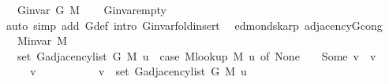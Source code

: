 \begin{isabellebody}
\ \ \ {\isachardoublequoteopen}G{\isachardot}{\kern0pt}invar\ {\isacharparenleft}{\kern0pt}G{}{\isacharunderscore}{\kern0pt}{}\ M{\isacharparenright}{\kern0pt}{\isachardoublequoteclose}%
\endisataginvisible
{\isafoldinvisible}%
%
\isadeliminvisible
\isanewline
%
\endisadeliminvisible
%
\isadelimproof
\ \ %
\endisadelimproof
%
\isatagproof
{}\isamarkupfalse%
\ G{\isachardot}{\kern0pt}invar{\isacharunderscore}{\kern0pt}empty\isanewline
\ \ \isamarkupfalse%
\ {\isacharparenleft}{\kern0pt}auto\ simp\ add{\isacharcolon}{\kern0pt}\ G{}{\isacharunderscore}{\kern0pt}{}{\isacharunderscore}{\kern0pt}def\ intro{\isacharcolon}{\kern0pt}\ G{\isachardot}{\kern0pt}invar{\isacharunderscore}{\kern0pt}fold{\isacharunderscore}{\kern0pt}insert{\isacharparenright}{\kern0pt}%
\endisatagproof
{\isafoldproof}%
%
\isadelimproof
\isanewline
%
\endisadelimproof
%
\isadeliminvisible
\isanewline
%
\endisadeliminvisible
%
\isataginvisible
{}\isamarkupfalse%
\ {\isacharparenleft}{\kern0pt}\ edmonds{\isacharunderscore}{\kern0pt}karp{\isacharparenright}{\kern0pt}\ adjacency{\isacharunderscore}{\kern0pt}G{}{\isacharunderscore}{\kern0pt}{}{\isacharunderscore}{\kern0pt}cong{\isacharcolon}{\kern0pt}\isanewline
\ \ \ {\isachardoublequoteopen}M{\isachardot}{\kern0pt}invar\ M{\isachardoublequoteclose}\isanewline
\ \ \ {\isachardoublequoteopen}set\ {\isacharparenleft}{\kern0pt}G{\isachardot}{\kern0pt}adjacency{\isacharunderscore}{\kern0pt}list\ {\isacharparenleft}{\kern0pt}G{}{\isacharunderscore}{\kern0pt}{}\ M{\isacharparenright}{\kern0pt}\ u{\isacharparenright}{\kern0pt}\ {\isacharequal}{\kern0pt}\ {\isacharparenleft}{\kern0pt}case\ M{\isacharunderscore}{\kern0pt}lookup\ M\ u\ of\ None\ {\isasymRightarrow}\ {\isacharbraceleft}{\kern0pt}{\isacharbraceright}{\kern0pt}\ {\isacharbar}{\kern0pt}\ Some\ v\ {\isasymRightarrow}\ {\isacharbraceleft}{\kern0pt}v{\isacharbraceright}{\kern0pt}{\isacharparenright}{\kern0pt}{\isachardoublequoteclose}%
\endisataginvisible
{\isafoldinvisible}%
%
\isadeliminvisible
\isanewline
%
\endisadeliminvisible
%
\isadelimproof
%
\endisadelimproof
%
\isatagproof
{}\isamarkupfalse%
\ {\isacharminus}{\kern0pt}\isanewline
\ \ \isacommand{{\isacharbraceleft}{\kern0pt}}\isamarkupfalse%
\ \isamarkupfalse%
\ v\isanewline
\ \ \ \ \isamarkupfalse%
\isanewline
\ \ \ \ \ \ {\isachardoublequoteopen}v\ {\isasymin}\ set\ {\isacharparenleft}{\kern0pt}G{\isachardot}{\kern0pt}adjacency{\isacharunderscore}{\kern0pt}list\ {\isacharparenleft}{\kern0pt}G{}{\isacharunderscore}{\kern0pt}{}\ M{\isacharparenright}{\kern0pt}\ u{\isacharparenright}{\kern0pt}\ {\isasymlongleftrightarrow}\isanewline

\end{isabellebody}
